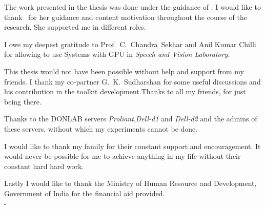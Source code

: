 \acknowledgements
The work presented in the thesis was done under the guidance of \thesisguide . I would like to thank \thesisguide ~for her guidance  and content motivation throughout the course of the research. She supported me in different roles.

I owe my deepest gratitude to Prof.~C.~Chandra~Sekhar and Anil Kumar Chilli for allowing to use Systems with GPU in {\it Speech and Vision Laboratory}.


This thesis would not have been possible without help and support from my friends. I thank my co-partner G.~K.~Sudharshan for some useful discussions and his contribution in the toolkit development.Thanks to all my friends, for just being there.

Thanks to the DONLAB servers \textit{Proliant},\textit{Dell-d1} and \textit{Dell-d2} and the admins of these servers, without which my experiments cannot be done.

I would like to thank my family for their constant support and encouragement. It would never be possible for me to achieve anything in my life without their constant hard hard work.

Lastly I would like to thank the Ministry of Human Resource and Development, Government of India for the financial aid provided.\\

\hfill - \thesisauthor
